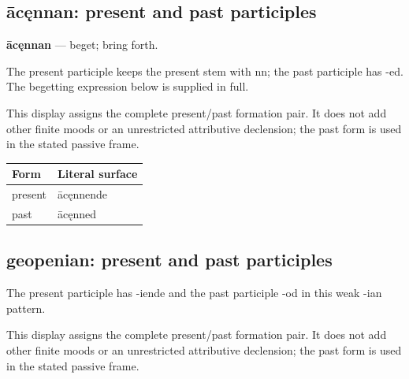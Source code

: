 \subsection*{ācęnnan: present and past participles}

\par\begin{minipage}{\linewidth}\raggedright
\textbf{ācęnnan} — beget; bring forth.

The present participle keeps the present stem with nn; the past participle has -ed. The begetting expression below is supplied in full.

This display assigns the complete present/\allowbreak{}past formation pair. It does not add other finite moods or an unrestricted attributive declension; the past form is used in the stated passive frame.

\par\begingroup
\fontsize{10.5}{13.2}\selectfont
\setlength{\LTleft}{0pt}\setlength{\LTright}{\fill}
\noindent
\begin{tabular}{@{}>{\raggedright\arraybackslash}p{55.85mm}>{\raggedright\arraybackslash}p{65.34mm}@{}}
\toprule
\textbf{Form} & \textbf{Literal surface} \\
\midrule
present & ācęnnende \\
past & ācęnned \\
\bottomrule
\end{tabular}
\par\endgroup

\end{minipage}\par
{}
\subsection*{geopenian: present and past participles}

The present participle has -iende and the past participle -od in this weak -ian pattern.

This display assigns the complete present/\allowbreak{}past formation pair. It does not add other finite moods or an unrestricted attributive declension; the past form is used in the stated passive frame.

